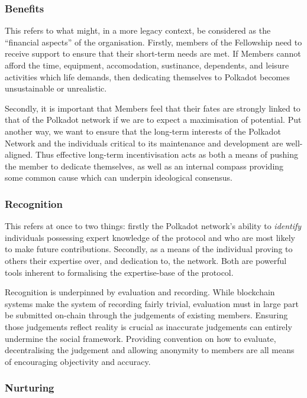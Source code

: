 \documentclass[9pt,oneside]{amsart}
\begin{document}
\subsubsection{Benefits}

This refers to what might, in a more legacy context, be considered as the ``financial aspects'' of the organisation. Firstly, members of the Fellowship need to receive support to ensure that their short-term needs are met. If Members cannot afford the time, equipment, accomodation, sustinance, dependents, and leisure activities which life demands, then dedicating themselves to Polkadot becomes unsustainable or unrealistic.

Secondly, it is important that Members feel that their fates are strongly linked to that of the Polkadot network if we are to expect a maximisation of potential. Put another way, we want to ensure that the long-term interests of the Polkadot Network and the individuals critical to its maintenance and development are well-aligned. Thus effective long-term incentivisation acts as both a means of pushing the member to dedicate themselves, as well as an internal compass providing some common cause which can underpin ideological consensus.

\subsubsection{Recognition}

This refers at once to two things: firstly the Polkadot network's ability to \emph{identify} individuals possessing expert knowledge of the protocol and who are most likely to make future contributions. Secondly, as a means of the individual proving to others their expertise over, and dedication to, the network. Both are powerful tools inherent to formalising the expertise-base of the protocol.

Recognition is underpinned by evaluation and recording. While blockchain systems make the system of recording fairly trivial, evaluation must in large part be submitted on-chain through the judgements of existing members. Ensuring those judgements reflect reality is crucial as inaccurate judgements can entirely undermine the social framework. Providing convention on how to evaluate, decentralising the judgement and allowing anonymity to members are all means of encouraging objectivity and accuracy.

\subsubsection{Nurturing}
\end{document}

